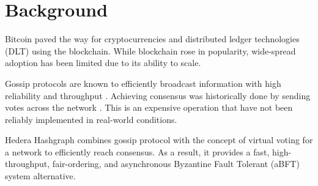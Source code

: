 \section{Background}

Bitcoin \cite{nakamoto2008peer} paved the way for cryptocurrencies and distributed ledger technologies (DLT) using the blockchain. While blockchain rose in popularity, wide-spread adoption has been limited due to its ability to scale. 


Gossip protocols are known to efficiently broadcast information with high reliability and throughput \cite{birman}. Achieving consensus was historically done by sending votes across the network \cite{berman1989towards}. This is an expensive operation that have not been reliably implemented in real-world conditions.

Hedera Hashgraph\cite{baird2016} combines gossip protocol with the concept of virtual voting for a network to efficiently reach consensus. As a result, it provides a fast, high-throughput, fair-ordering, and asynchronous Byzantine Fault Tolerant (aBFT) system alternative.
